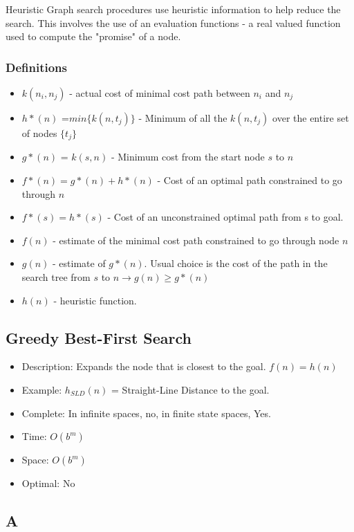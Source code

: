 \documentclass[11pt, oneside]{article}   	%
\begin{document}
Heuristic Graph search procedures use heuristic information to help reduce the search. This involves the use of an evaluation functions - a real valued function used to compute the "promise" of a node.

\subsubsection{Definitions}

\begin{itemize}
\item $k(n_i,n_j)$ - actual cost of minimal cost path between $n_i$ and $n_j$
\item $h*(n)$ =$ min\{k(n,t_j)\}$ - Minimum of all the $k(n,t_j)$ over the entire set of nodes $\{t_j\}$
\item $g*(n)$ = $k(s,n)$ - Minimum cost from the start node $s$ to $n$
\item $f*(n)=g*(n)+h*(n)$ - Cost of an optimal path constrained to go through $n$
\item $f*(s)=h*(s)$ - Cost of an unconstrained optimal path from s to goal.
\item $f(n)$ - estimate of the minimal cost path constrained to go through node $n$
\item $g(n)$ - estimate of $g*(n)$. Usual choice is the cost of the path in the search tree from $s$ to $n \rightarrow g(n) \geq g*(n)$ 
\item $h(n)$ - heuristic function.
\end{itemize}

\subsection{Greedy Best-First Search}

\begin{itemize}
\item Description: Expands the node that is closest to the goal. $f(n) = h(n)$
\item Example: $h_{SLD}(n)$ = Straight-Line Distance to the goal.
\item Complete: In infinite spaces, no, in finite state spaces, Yes.
\item Time: $O(b^m)$
\item Space: $O(b^m)$
\item Optimal: No
\end{itemize}

\subsection{A}
\end{document}
